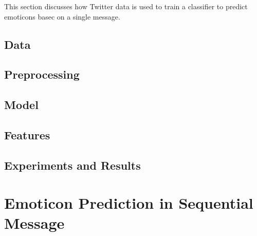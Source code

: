 \documentclass{article} %
\begin{document}
\begin{comment}
Approach (roughly 2-3 pages)
• Explain the model; if any important assumptions are made at this stage, explain why they are
reasonable or necessary
• Explain learning / inference algorithms
• Explaining (perhaps briefly) any necessary preprocessing / postprocesing / data acquisition stages
(maybe earlier, depending on the project; may also move to the experimental section)
\end{comment}

This section discusses how Twitter data is used to train a classifier to predict emoticons basec on a single message. 


\subsection{Data}



\subsection{Preprocessing \label{sec:preprocessing}}



\subsection{Model}



\subsection{Features \label{sec:features}}



\subsection{Experiments and Results}



\section{Emoticon Prediction in Sequential Message}

\begin{comment}
Approach (roughly 2-3 pages)
• Explain the model; if any important assumptions are made at this stage, explain why they are
reasonable or necessary
• Explain learning / inference algorithms
• Explaining (perhaps briefly) any necessary preprocessing / postprocesing / data acquisition stages
(maybe earlier, depending on the project; may also move to the experimental section)
\end{comment}
\end{document}
